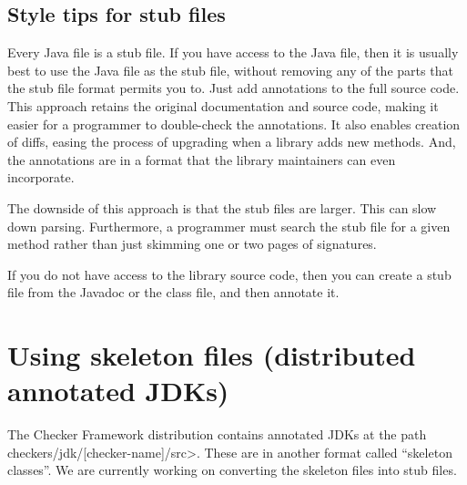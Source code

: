 \subsection{Style tips for stub files}

Every Java file is a stub file.  If you have access to the Java file, then
it is usually best to use the Java file as the stub file, without removing
any of the parts that the stub file format permits you to.  Just add
annotations to the full source code.  This approach retains the original
documentation and source code, making it easier for a programmer to
double-check the annotations.  It also enables creation of diffs, easing
the process of upgrading when a library adds new methods.  And, the
annotations are in a format that the library maintainers can even
incorporate.

The downside of this approach is that the stub files are larger.  This can
slow down parsing.  Furthermore, a programmer must search the stub file
for a given method rather than just skimming one or two pages of signatures.

If you do not have access to the library source code, then you can create a
stub file from the Javadoc or the class file, and then annotate it.




\section{Using skeleton files (distributed annotated JDKs)\label{skeleton-using}\label{skeleton}}

The Checker Framework distribution contains 
annotated JDKs at the path \<checkers/jdk/[checker-name]/src>.
These are in another format called
``skeleton classes''.  We are currently working on converting the skeleton
files into stub files.



